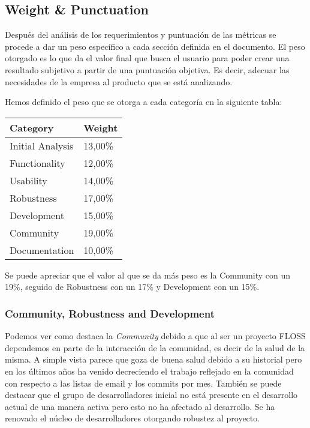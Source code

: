 \documentclass[11pt]{scrartcl}
\begin{document}
\subsection{Weight \& Punctuation}

Despu\'es del an\'alisis de los requerimientos y puntuaci\'on de las m\'etricas se procede a dar un peso espec\'ifico a cada secci\'on definida en el documento. El peso otorgado es lo que da el valor final que busca el usuario para poder crear una resultado subjetivo a partir de una puntuaci\'on objetiva. Es decir, adecuar las necesidades de la empresa al producto que se est\'a analizando.

Hemos definido el peso que se otorga a cada categor\'ia en la siguiente tabla:

    \begin{tabular}{|l|l|}
        \hline Category & Weight\\
        \hline Initial Analysis	 & 13,00\%\\
        \hline Functionality & 12,00\%\\
        \hline Usability & 14,00\%\\
        \hline Robustness & 17,00\%\\
        \hline Development & 15,00\%\\
        \hline Community & 19,00\%\\
        \hline Documentation & 10,00\%\\
        \hline
    \end{tabular}

\par Se puede apreciar que el valor al que se da m\'as peso es la Community con un 19\%, seguido de Robustness con un 17\% y Development con un 15\%. 

\subsubsection{Community, Robustness and Development}

\par Podemos ver como destaca la \emph{Community} debido a que al ser un proyecto FLOSS dependemos en parte de la interacci\'on de la comunidad, es decir de la salud de la misma. A simple vista parece que goza de buena salud debido a su historial pero en los \'ultimos a\~nos ha venido decreciendo el trabajo reflejado en la comunidad con respecto a las listas de email y los commits por mes. Tambi\'en se puede destacar que el grupo de desarrolladores inicial no est\'a presente en el desarrollo actual de una manera activa pero esto no ha afectado al desarrollo. Se ha renovado el n\'ucleo de desarrolladores otorgando robustez al proyecto.
\end{document}
